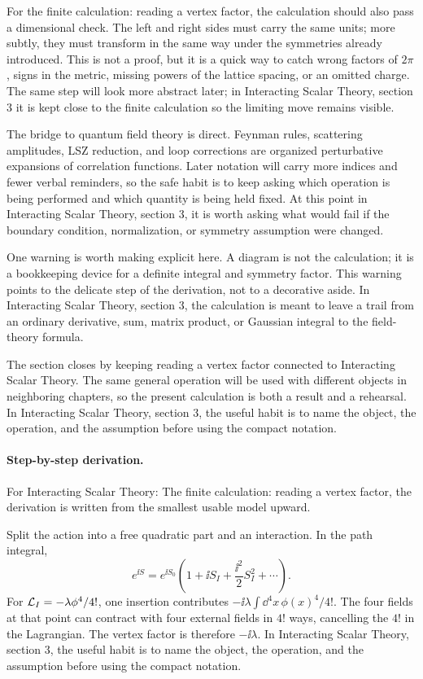 For the finite calculation: reading a vertex factor, the calculation should also pass a dimensional check.  The left and right sides must carry the same units; more subtly, they must transform in the same way under the symmetries already introduced.  This is not a proof, but it is a quick way to catch wrong factors of \(2\pi\), signs in the metric, missing powers of the lattice spacing, or an omitted charge.  The same step will look more abstract later; in Interacting Scalar Theory, section 3 it is kept close to the finite calculation so the limiting move remains visible.

The bridge to quantum field theory is direct.  Feynman rules, scattering amplitudes, LSZ reduction, and loop corrections are organized perturbative expansions of correlation functions.  Later notation will carry more indices and fewer verbal reminders, so the safe habit is to keep asking which operation is being performed and which quantity is being held fixed.  At this point in Interacting Scalar Theory, section 3, it is worth asking what would fail if the boundary condition, normalization, or symmetry assumption were changed.

One warning is worth making explicit here.  A diagram is not the calculation; it is a bookkeeping device for a definite integral and symmetry factor.  This warning points to the delicate step of the derivation, not to a decorative aside.  In Interacting Scalar Theory, section 3, the calculation is meant to leave a trail from an ordinary derivative, sum, matrix product, or Gaussian integral to the field-theory formula.

The section closes by keeping reading a vertex factor connected to Interacting Scalar Theory.  The same general operation will be used with different objects in neighboring chapters, so the present calculation is both a result and a rehearsal.  In Interacting Scalar Theory, section 3, the useful habit is to name the object, the operation, and the assumption before using the compact notation.



\paragraph{Step-by-step derivation.}

For Interacting Scalar Theory: The finite calculation: reading a vertex factor, the derivation is written from the smallest usable model upward.

Split the action into a free quadratic part and an interaction.  In the path integral,
\[
  e^{\ii S}=e^{\ii S_0}\left(1+\ii S_I+\frac{\ii^2}{2}S_I^2+\cdots\right).
\]
For \(\mathcal L_I=-\lambda\phi^4/4!\), one insertion contributes \(-\ii\lambda\int\dd^4x\,\phi(x)^4/4!\).  The four fields at that point can contract with four external fields in \(4!\) ways, cancelling the \(4!\) in the Lagrangian.  The vertex factor is therefore \(-\ii\lambda\).  In Interacting Scalar Theory, section 3, the useful habit is to name the object, the operation, and the assumption before using the compact notation.

